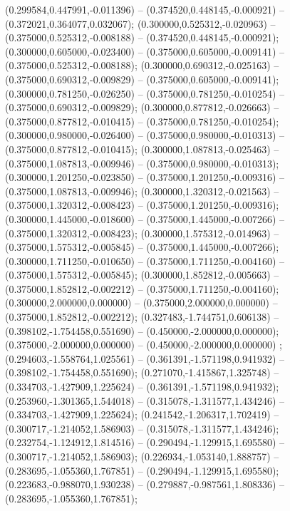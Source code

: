  (0.299584,0.447991,-0.011396) -- (0.374520,0.448145,-0.000921) -- (0.372021,0.364077,0.032067);
 (0.300000,0.525312,-0.020963) -- (0.375000,0.525312,-0.008188) -- (0.374520,0.448145,-0.000921);
 (0.300000,0.605000,-0.023400) -- (0.375000,0.605000,-0.009141) -- (0.375000,0.525312,-0.008188);
 (0.300000,0.690312,-0.025163) -- (0.375000,0.690312,-0.009829) -- (0.375000,0.605000,-0.009141);
 (0.300000,0.781250,-0.026250) -- (0.375000,0.781250,-0.010254) -- (0.375000,0.690312,-0.009829);
 (0.300000,0.877812,-0.026663) -- (0.375000,0.877812,-0.010415) -- (0.375000,0.781250,-0.010254);
 (0.300000,0.980000,-0.026400) -- (0.375000,0.980000,-0.010313) -- (0.375000,0.877812,-0.010415);
 (0.300000,1.087813,-0.025463) -- (0.375000,1.087813,-0.009946) -- (0.375000,0.980000,-0.010313);
 (0.300000,1.201250,-0.023850) -- (0.375000,1.201250,-0.009316) -- (0.375000,1.087813,-0.009946);
 (0.300000,1.320312,-0.021563) -- (0.375000,1.320312,-0.008423) -- (0.375000,1.201250,-0.009316);
 (0.300000,1.445000,-0.018600) -- (0.375000,1.445000,-0.007266) -- (0.375000,1.320312,-0.008423);
 (0.300000,1.575312,-0.014963) -- (0.375000,1.575312,-0.005845) -- (0.375000,1.445000,-0.007266);
 (0.300000,1.711250,-0.010650) -- (0.375000,1.711250,-0.004160) -- (0.375000,1.575312,-0.005845);
 (0.300000,1.852812,-0.005663) -- (0.375000,1.852812,-0.002212) -- (0.375000,1.711250,-0.004160);
 (0.300000,2.000000,0.000000) -- (0.375000,2.000000,0.000000) -- (0.375000,1.852812,-0.002212);
 (0.327483,-1.744751,0.606138) -- (0.398102,-1.754458,0.551690) -- (0.450000,-2.000000,0.000000);
 (0.375000,-2.000000,0.000000) -- (0.450000,-2.000000,0.000000) ;
 (0.294603,-1.558764,1.025561) -- (0.361391,-1.571198,0.941932) -- (0.398102,-1.754458,0.551690);
 (0.271070,-1.415867,1.325748) -- (0.334703,-1.427909,1.225624) -- (0.361391,-1.571198,0.941932);
 (0.253960,-1.301365,1.544018) -- (0.315078,-1.311577,1.434246) -- (0.334703,-1.427909,1.225624);
 (0.241542,-1.206317,1.702419) -- (0.300717,-1.214052,1.586903) -- (0.315078,-1.311577,1.434246);
 (0.232754,-1.124912,1.814516) -- (0.290494,-1.129915,1.695580) -- (0.300717,-1.214052,1.586903);
 (0.226934,-1.053140,1.888757) -- (0.283695,-1.055360,1.767851) -- (0.290494,-1.129915,1.695580);
 (0.223683,-0.988070,1.930238) -- (0.279887,-0.987561,1.808336) -- (0.283695,-1.055360,1.767851);
